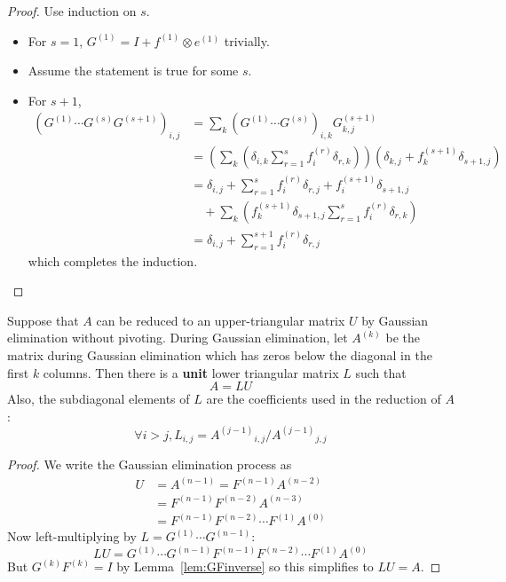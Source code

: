 \begin{proof}
	Use induction on $s$.
	\begin{itemize}
		\item For $s = 1$, $G^{(1)} = I + f^{(1)} \otimes e^{(1)}$ trivially.
		\item Assume the statement is true for some $s$.
		\item For $s + 1$,
		\[
			\begin{aligned}
				{(G^{(1)} \cdots G^{(s)} G^{(s + 1)})}_{i, j}
					& = \sum_k {(G^{(1)} \cdots G^{(s)})}_{i, k} G_{k, j}^{(s + 1)} \\
					& = \left( \sum_k \left( \delta_{i, k} \sum_{r = 1}^{s} f_i^{(r)} \delta_{r, k} \right) \right) \left( \delta_{k, j} + f_k^{(s + 1)} \delta_{s + 1, j} \right) \\
					& = \delta_{i, j} + \sum_{r = 1}^{s} f_i^{(r)} \delta_{r, j} + f_i^{(s + 1)} \delta_{s + 1, j} \\
					& \quad + \sum_k \left( f_k^{(s + 1)} \delta_{s + 1, j} \sum_{r = 1}^{s} f_i^{(r)} \delta_{r, k} \right) \\
					& = \delta_{i, j} + \sum_{r = 1}^{s + 1} f_i^{(r)} \delta_{r, j}
			\end{aligned}
		\]
		which completes the induction.
	\end{itemize}
\end{proof}

\begin{theorem}
	Suppose that $A$ can be reduced to an upper-triangular matrix $U$ by Gaussian elimination without pivoting. During Gaussian elimination, let $A^{(k)}$ be the matrix during Gaussian elimination which has zeros below the diagonal in the first $k$ columns. Then there is a \textbf{unit} lower triangular matrix $L$ such that
	\[
		A = LU
	\]
	Also, the subdiagonal elements of $L$ are the coefficients used in the reduction of $A$:
	\[
		\forall i > j, L_{i, j} = {A^{(j - 1)}}_{i, j} / {A^{(j - 1)}}_{j, j}
	\]
\end{theorem}

\begin{proof}
	We write the Gaussian elimination process as
	\[
		\begin{aligned}
			U
				& = A^{(n - 1)} = F^{(n - 1)} A^{(n - 2)} \\
				& = F^{(n - 1)} F^{(n - 2)} A^{(n - 3)} \\
				& = F^{(n - 1)} F^{(n - 2)} \cdots F^{(1)} A^{(0)}
		\end{aligned}
	\]
	Now left-multiplying by $L = G^{(1)} \cdots G^{(n - 1)}$:
	\[
		LU = G^{(1)} \cdots G^{(n - 1)} F^{(n - 1)} F^{(n - 2)} \cdots F^{(1)} A^{(0)}
	\]
	But $G^{(k)} F^{(k)} = I$ by Lemma~\ref{lem:GFinverse} so this simplifies to $LU = A$.
\end{proof}

